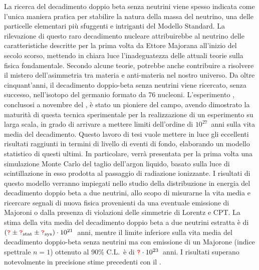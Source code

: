 
La ricerca del decadimento doppio beta senza neutrini viene spesso indicata come l'unica
maniera pratica per stabilire la natura della massa del neutrino, una delle particelle
elementari più sfuggenti e intriganti del Modello Standard. La rilevazione di questo raro
decadimento nucleare attribuirebbe al neutrino delle caratteristiche descritte per la
prima volta da Ettore Majorana all'inizio del secolo scorso, mettendo in chiara luce
l'inadeguatezza delle attuali teorie sulla fisica fondamentale. Secondo alcune teorie,
potrebbe anche contribuire a risolvere il mistero dell'asimmetria tra materia e
anti-materia nel nostro universo. Da oltre cinquant'anni, il decadimento doppio-beta senza
neutrini viene ricercato, senza successo, nell'isotopo del germanio formato da 76
nucleoni. L'esperimento \gerda, conclusosi a novembre del , è stato un pioniere
del campo, avendo dimostrato la maturità di questa tecnica sperimentale per la
realizzazione di un esperimento su larga scala, in grado di arrivare a mettere limiti
dell'ordine di $10^{27}$~anni sulla vita media del decadimento.  Questo lavoro di tesi
vuole mettere in luce gli eccellenti risultati raggiunti in termini di livello di eventi
di fondo, elaborando un modello statistico di questi ultimi. In particolare, verrà
presentata per la prima volta una simulazione Monte Carlo del taglio dell'argon liquido,
basato sulla luce di scintillazione in esso prodotta al passaggio di radiazione
ionizzante. I risultati di questo modello verranno impiegati nello studio della
distribuzione in energia del decadimento doppio beta a due neutrini, allo scopo di
misurarne la vita media e ricercare segnali di nuova fisica provenienti da una eventuale
emissione di Majoroni o dalla presenza di violazioni delle simmetrie di Lorentz e CPT. La
stima della vita media del decadimento doppio beta a due neutrini estratta è di
$(\textcolor{red}{\texttt{?}} \pm {\textcolor{red}{\texttt{?}}}_\text{stat} \pm {\textcolor{red}{\texttt{?}}}_\text{sys}) \cdot 10^{21}$~anni, mentre il
limite inferiore sulla vita media del decadimento doppio-beta senza neutrini ma con
emissione di un Majorone (indice spettrale $n=1$) ottenuto al 90\% C.L.~è di $\textcolor{red}{\texttt{?}}
\cdot 10^{23}$~anni. I risultati superano notevolmente in precisione stime precedenti con
il \gesix.

